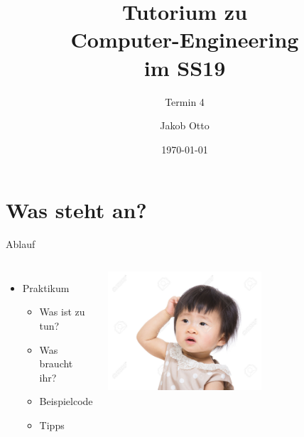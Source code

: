 \documentclass[aspectratio=169,presentation]{beamer}
\date{\today}
\newcommand{\terminNummer}{4}
\begin{document}
\title[CE Tutorium]{Tutorium zu\\Computer-Engineering\\im SS19}
\subtitle{Termin \terminNummer}
\author[Otto]{Jakob Otto}
\subject{CE Tutorium}

\titlepage

\section{Was steht an?}
\begin{frame}{Ablauf}
	\begin{columns}
		\begin{itemize}
			\item Praktikum
      \begin{itemize}
        \item Was ist zu tun?
        \item Was braucht ihr?
        \item Beispielcode
				\item Tipps
			\end{itemize}
		\end{itemize}
		\includegraphics[width=0.6\textwidth]{kratzen}
	\end{columns}
\end{frame}

\end{document}
